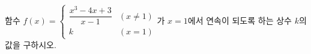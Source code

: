 함수 $f(x)=\begin{cases} \dfrac{x^3-4x+3}{x-1} & (x\ne 1) \\ k & (x=1) \end{cases}$가 $x=1$에서 연속이 되도록 하는 상수 $k$의 값을 구하시오.

